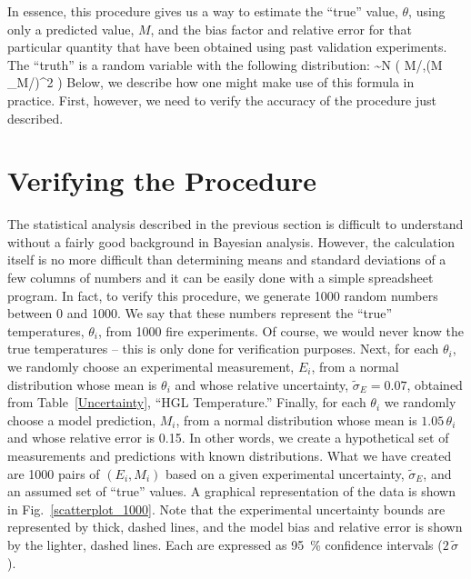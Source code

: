 In essence, this procedure gives us a way to estimate the ``true'' value, $\theta$, using only a predicted value, $M$, and the bias factor and relative error
for that particular quantity that have been obtained using past validation experiments. The ``truth'' is a random variable with the following distribution:
\be \theta \sim N \left( M/\delta,(M \, \widetilde{\sigma}_M/\delta)^2 \right) \label{truth} \ee
Below, we describe how one might make use of this formula in practice. First, however, we need to verify the accuracy of the procedure just described.

\section{Verifying the Procedure}

The statistical analysis described in the previous section is difficult to understand without a fairly good background in Bayesian analysis.
However, the calculation itself is no more difficult than determining means and standard deviations of a few columns of numbers and it can be easily
done with a simple spreadsheet program.
In fact, to verify this procedure, we generate 1000 random numbers between 0 and 1000. We say that these numbers represent the ``true'' temperatures, $\theta_i$, from 1000 fire
experiments. Of course, we would never know the true temperatures -- this is only done for verification purposes. Next, for each $\theta_i$, we randomly choose an
experimental measurement, $E_i$, from a normal distribution whose mean is $\theta_i$ and whose relative uncertainty, $\widetilde{\sigma}_E=0.07$, obtained from Table~\ref{Uncertainty},
``HGL Temperature.'' Finally, for each $\theta_i$ we randomly choose a model prediction, $M_i$, from a normal distribution whose mean is $1.05 \, \theta_i$
and whose relative error is 0.15. In other words, we create a hypothetical set of measurements and predictions with known distributions.
What we have created are 1000 pairs of $(E_i,M_i)$ based on a given experimental uncertainty, $\widetilde{\sigma}_E$, and an assumed set of ``true'' values. A graphical
representation of the data is shown in Fig.~\ref{scatterplot_1000}. Note that the experimental uncertainty bounds are represented by thick, dashed lines, and the model
bias and relative error is shown by the lighter, dashed lines. Each are expressed as 95~\% confidence intervals ($2 \, \widetilde{\sigma}$).
